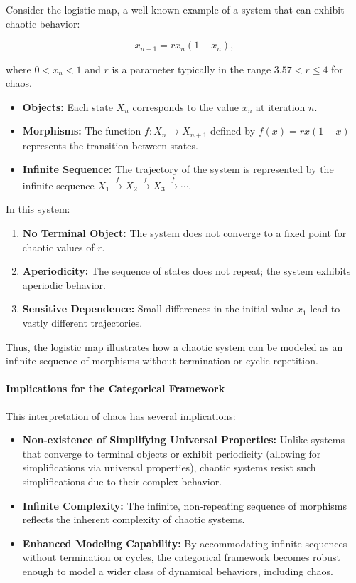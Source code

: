 \documentclass{article}
\theoremstyle{definition}
\theoremstyle{remark}
\begin{document}
	Consider the logistic map, a well-known example of a system that can exhibit chaotic behavior:
	
	\[
	x_{n+1} = r x_n (1 - x_n),
	\]
	
	where $0 < x_n < 1$ and $r$ is a parameter typically in the range $3.57 < r \leq 4$ for chaos.
	
	\begin{itemize}
		\item \textbf{Objects:} Each state $X_n$ corresponds to the value $x_n$ at iteration $n$.
		\item \textbf{Morphisms:} The function $f: X_n \rightarrow X_{n+1}$ defined by $f(x) = r x (1 - x)$ represents the transition between states.
		\item \textbf{Infinite Sequence:} The trajectory of the system is represented by the infinite sequence $X_1 \xrightarrow{f} X_2 \xrightarrow{f} X_3 \xrightarrow{f} \cdots$.
	\end{itemize}
	
	In this system:
	
	\begin{enumerate}
		\item \textbf{No Terminal Object:} The system does not converge to a fixed point for chaotic values of $r$.
		\item \textbf{Aperiodicity:} The sequence of states does not repeat; the system exhibits aperiodic behavior.
		\item \textbf{Sensitive Dependence:} Small differences in the initial value $x_1$ lead to vastly different trajectories.
	\end{enumerate}
	
	Thus, the logistic map illustrates how a chaotic system can be modeled as an infinite sequence of morphisms without termination or cyclic repetition.
	
	\paragraph{Implications for the Categorical Framework}
	
	This interpretation of chaos has several implications:
	
	\begin{itemize}
		\item \textbf{Non-existence of Simplifying Universal Properties:} Unlike systems that converge to terminal objects or exhibit periodicity (allowing for simplifications via universal properties), chaotic systems resist such simplifications due to their complex behavior.
		\item \textbf{Infinite Complexity:} The infinite, non-repeating sequence of morphisms reflects the inherent complexity of chaotic systems.
		\item \textbf{Enhanced Modeling Capability:} By accommodating infinite sequences without termination or cycles, the categorical framework becomes robust enough to model a wider class of dynamical behaviors, including chaos.
	\end{itemize}
	
\end{document}
